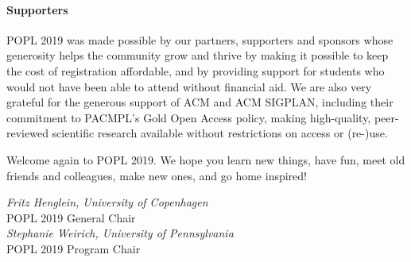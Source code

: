 \paragraph{Supporters}
%
POPL 2019 was made possible by our partners, supporters
and sponsors whose generosity helps the community grow
and thrive by making it possible to keep the cost of
registration affordable, and by providing support for
students who would not have been able to attend without
financial aid.
%
We are also very grateful for the generous support of
ACM and ACM SIGPLAN, including their commitment to
PACMPL's Gold Open Access policy, making high-quality,
peer-reviewed scientific research available without
restrictions on access or (re-)use.

\medskip
Welcome again to POPL 2019. We hope you learn new things,
have fun, meet old friends and colleagues, make new
ones, and go home inspired!

\begin{flushright}
\textit{Fritz Henglein, University of Copenhagen} \\
POPL 2019 General Chair
\medskip \\
\textit{Stephanie Weirich, University of Pennsylvania} \\
POPL 2019 Program Chair
\medskip \\
\end{flushright}




\newpage
